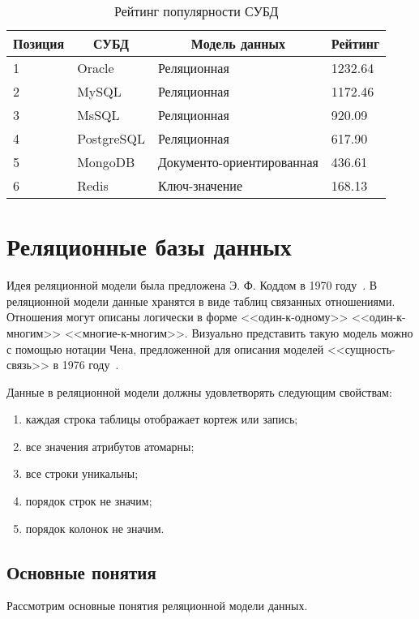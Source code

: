 \begin{table}[h!]
    \centering
    \caption{Рейтинг популярности СУБД}
    \label{tab:db_ranking}
    \begin{tabular}{|l|l|l|l|}
        \hline
        \multicolumn{1}{|c|}{Позиция} & \multicolumn{1}{c|}{СУБД} & \multicolumn{1}{c|}{Модель данных} & \multicolumn{1}{c|}{Рейтинг} \\ \hline
        1 & Oracle     & Реляционная               & 1232.64 \\ \hline
        2 & MySQL      & Реляционная               & 1172.46 \\ \hline
        3 & MsSQL      & Реляционная               & 920.09  \\ \hline
        4 & PostgreSQL & Реляционная               & 617.90  \\ \hline
        5 & MongoDB    & Документо-ориентированная & 436.61  \\ \hline
        6 & Redis      & Ключ-значение             & 168.13  \\ \hline
    \end{tabular}
\end{table}



\section{Реляционные базы данных}
Идея реляционной модели была предложена Э. Ф. Коддом в 1970 году~\cite{Codd_Relational}.
В реляционной модели данные хранятся в виде таблиц связанных отношениями.
Отношения могут описаны логически в форме 
<<один-к-одному>> <<один-к-многим>> <<многие-к-многим>>.
Визуально представить такую модель можно с помощью нотации Чена, 
предложенной для описания моделей <<сущность-связь>> в 1976 году~\cite{Chen}.

Данные в реляционной модели должны удовлетворять следующим свойствам:
\begin{enumerate}
    \item каждая строка таблицы отображает кортеж или запись;
    \item все значения атрибутов атомарны;
    \item все строки уникальны;
    \item порядок строк не значим;
    \item порядок колонок не значим.
\end{enumerate}

\clearpage

\subsection{Основные понятия}
Рассмотрим основные понятия реляционной модели данных.
